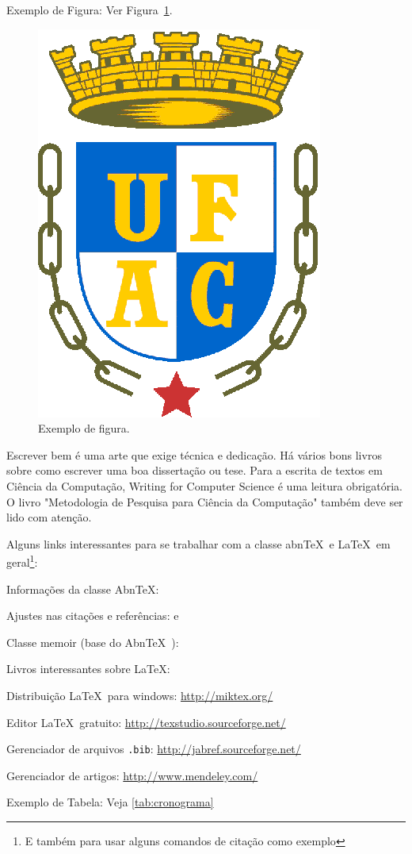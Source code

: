 \documentclass[
	12pt,				    %
	openright,			    %
	oneside,			    %
	a4paper,			    %
    sumario=tradicional,    %
	english,			    %
	brazil,				    %
	]{abntex2}
\begin{document}
Exemplo de Figura: Ver Figura~\ref{fig:exefig}.

\begin{figure}[!ht]
\centering
\includegraphics[width=0.3\linewidth]{figuras/exefig.eps}
\caption{Exemplo de figura.}
\label{fig:exefig}
\end{figure}

Escrever bem é uma arte que exige técnica e dedicação. Há vários bons livros sobre como escrever uma boa dissertação ou tese. Para a escrita de textos em Ciência da Computação, Writing for Computer Science \cite{zobel2014} é uma leitura obrigatória. O livro "Metodologia de Pesquisa para Ciência da Computação" \cite{wazlawick2009} também deve ser lido com atenção. 

Alguns links interessantes para se trabalhar com a classe abn\TeX\ e \LaTeX\ em geral\footnote{E também para usar alguns comandos de citação como exemplo}:
\begin{alineas}
  \item Informações da classe Abn\TeX : 
  \item Ajustes nas citações e referências:  e 
  \item Classe memoir (base do Abn\TeX\ ): 
  \item Livros interessantes sobre \LaTeX: \cite{Dongen2012,LeslieLamport90,FrankMittelbach111,Dongen2012}
  \item Distribuição \LaTeX\ para windows: \url{http://miktex.org/}
  \item Editor \LaTeX\ gratuito: \url{http://texstudio.sourceforge.net/}
  \item Gerenciador de arquivos \texttt{.bib}: \url{http://jabref.sourceforge.net/}
  \item Gerenciador de artigos: \url{http://www.mendeley.com/}
  \item Exemplo de Tabela: Veja \autoref{tab:cronograma}
\end{alineas}
\end{document}

